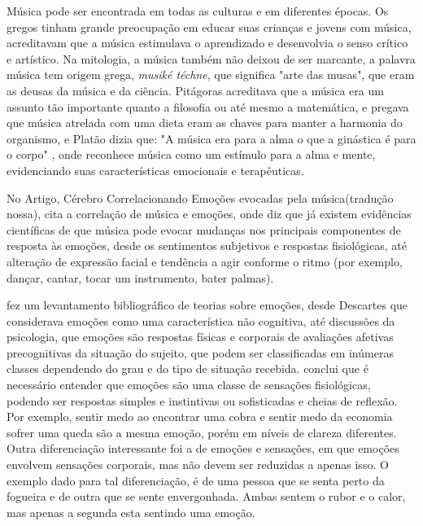 \documentclass[
	12pt,				%
	openright,			%
	oneside,
	a4paper,			%
	english,			%
	french,				%
	spanish,			%
	brazil				%
	]{abntex2}
\begin{document}
Música pode ser encontrada em todas as culturas e em diferentes épocas. Os gregos tinham grande preocupação em educar suas crianças e jovens com música, acreditavam que a música estimulava o aprendizado e desenvolvia o senso crítico e artístico\cite{uriarte2004musica}. Na mitologia, a música também não deixou de ser marcante, a palavra música tem origem grega, \textit{musiké téchne}, que significa "arte das musas", que eram as deusas da música e da ciência. Pitágoras acreditava que a música era um assunto tão importante quanto a filosofia ou até mesmo a matemática, e pregava que música atrelada com uma dieta eram as chaves para manter a harmonia do organismo\cite{uriarte2004musica}, e Platão dizia que: "A música era para a alma o que a ginástica é para o corpo" \cite{plato1988republic}, onde reconhece música como um estímulo para a alma e mente, evidenciando suas características emocionais e terapêuticas.

No Artigo, Cérebro Correlacionando Emoções evocadas pela música(tradução nossa),  cita a correlação de música e emoções, onde diz que já existem evidências científicas de que música pode evocar mudanças nos principais componentes de resposta às emoções, desde os sentimentos subjetivos e respostas fisiológicas, até alteração de expressão facial e tendência a agir conforme o ritmo (por exemplo, dançar, cantar, tocar um instrumento, bater palmas).  

 fez um levantamento bibliográfico de teorias sobre emoções, desde Descartes que considerava emoções como uma característica não cognitiva, até discussões da psicologia, que emoções são respostas físicas e corporais de avaliações afetivas precognitivas da situação do sujeito, que podem ser classificadas em inúmeras classes dependendo do grau e do tipo de situação recebida.  conclui que é necessário entender que emoções são uma classe de sensações fisiológicas, podendo ser respostas simples e instintivas ou sofisticadas e cheias de reflexão. Por exemplo, sentir medo ao encontrar uma cobra e sentir medo da economia sofrer uma queda são a mesma emoção, porém em níveis de clareza diferentes. Outra diferenciação interessante foi a de emoções e sensações, em que emoções envolvem sensações corporais, mas não devem ser reduzidas a apenas isso. O exemplo dado para tal diferenciação, é de uma pessoa que se senta perto da fogueira e de outra que se sente envergonhada. Ambas sentem o rubor e o calor, mas apenas a segunda esta sentindo uma emoção. 
\end{document}
